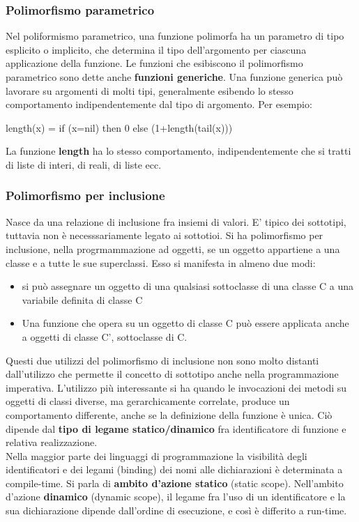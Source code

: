 \documentclass{article}
\begin{document}
	\subsubsection{Polimorfismo parametrico}
	Nel poliformismo parametrico, una funzione polimorfa ha un parametro di tipo esplicito o implicito, che determina il tipo dell'argomento per ciascuna applicazione della funzione. Le funzioni che esibiscono il polimorfismo parametrico sono dette anche \textbf{funzioni generiche}. Una funzione generica può lavorare su argomenti di molti tipi, generalmente esibendo lo stesso comportamento indipendentemente dal tipo di argomento. Per esempio:
	\begin{center}
		length(x) = if (x=nil) then 0 else (1+length(tail(x)))
	\end{center}
	La funzione \textbf{length} ha lo stesso comportamento, indipendentemente che si tratti di liste di interi, di reali, di liste ecc.
	\subsubsection{Polimorfismo per inclusione}
	Nasce da una relazione di inclusione fra insiemi di valori. E' tipico dei sottotipi, tuttavia non è necesssariamente legato ai sottotioi. Si ha polimorfismo per inclusione, nella progrmammazione ad oggetti, se un oggetto appartiene a una classe e a tutte le sue superclassi. Esso si manifesta in almeno due modi:
	\begin{itemize}
		\item si può assegnare un oggetto di una qualsiasi sottoclasse di una classe C a una variabile definita di classe C
		\item Una funzione che opera su un oggetto di classe C può essere applicata anche a oggetti di classe C', sottoclasse di C.
	\end{itemize}
	Questi due utilizzi del polimorfismo di inclusione non sono molto distanti dall'utilizzo che permette il concetto di sottotipo anche nella programmazione imperativa. L'utilizzo più interessante si ha quando le invocazioni dei metodi su oggetti di classi diverse, ma gerarchicamente correlate, produce un comportamento differente, anche se la definizione della funzione è unica. Ciò dipende dal \textbf{tipo di legame statico/dinamico} fra identificatore di funzione e relativa realizzazione.
	\vspace{\baselineskip} \\
	Nella maggior parte dei linguaggi di programmazione la visibilità degli identificatori e dei legami (binding) dei nomi alle dichiarazioni è determinata a compile-time. Si parla di \textbf{ambito d'azione statico} (static scope). Nell'ambito d'azione \textbf{dinamico} (dynamic scope), il legame fra l'uso di un identificatore e la sua dichiarazione dipende dall'ordine di esecuzione, e così è differito a run-time.
\end{document}
